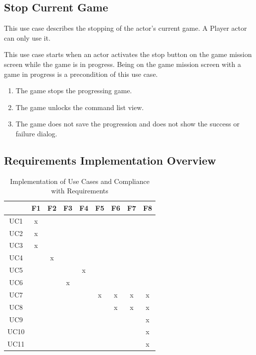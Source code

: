 \subsection{Stop Current Game}

This use case describes the stopping of the actor's current game.
A Player actor can only use it.

This use case starts when an actor activates the stop button on the game mission screen while the game is in progress.
Being on the game mission screen with a game in progress is a precondition of this use case.

\begin{enumerate}
    \item The game stops the progressing game.
    \item The game unlocks the command list view.
    \item The game does not save the progression and does not show the success or failure dialog. 
\end{enumerate}

\let\thesubsection=\oldsubsection

\subsection{Requirements Implementation Overview}

\begin{table}[]
    \centering
    \begin{tabular}{|c||c|c|c|c|c|c|c|c|}
        \hline
         & F1 & F2 & F3 & F4 & F5 & F6 & F7 & F8  \\\hline\hline
    UC1  & x  &    &    &    &    &    &    &     \\\hline
    UC2  & x  &    &    &    &    &    &    &     \\\hline
    UC3  & x  &    &    &    &    &    &    &     \\\hline
    UC4  &    & x  &    &    &    &    &    &     \\\hline
    UC5  &    &    &    & x  &    &    &    &     \\\hline
    UC6  &    &    & x  &    &    &    &    &     \\\hline
    UC7  &    &    &    &    & x  & x  & x  & x   \\\hline
    UC8  &    &    &    &    &    & x  & x  & x   \\\hline
    UC9  &    &    &    &    &    &    &    & x   \\\hline
    UC10 &    &    &    &    &    &    &    & x   \\\hline
    UC11 &    &    &    &    &    &    &    & x   \\\hline
    \end{tabular}
    \caption{Implementation of Use Cases and Compliance with Requirements}
    \label{table:usecases-requirements}
\end{table}

